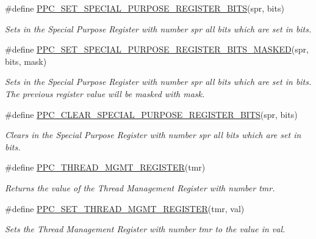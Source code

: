 \begin{DoxyCompactItemize}
\#define \mbox{\hyperlink{group__RTEMSBSPsPowerPCSharedUtility_ga3b8f65ba404c615d00c98d67c03a1240}{P\+P\+C\+\_\+\+S\+E\+T\+\_\+\+S\+P\+E\+C\+I\+A\+L\+\_\+\+P\+U\+R\+P\+O\+S\+E\+\_\+\+R\+E\+G\+I\+S\+T\+E\+R\+\_\+\+B\+I\+TS}}(spr,  bits)
\begin{DoxyCompactList}\small\item\em Sets in the Special Purpose Register with number {\itshape spr} all bits which are set in {\itshape bits}. \end{DoxyCompactList}\item 
\#define \mbox{\hyperlink{group__RTEMSBSPsPowerPCSharedUtility_gaabbe2ec03b9f2d8480196fbb227ce74d}{P\+P\+C\+\_\+\+S\+E\+T\+\_\+\+S\+P\+E\+C\+I\+A\+L\+\_\+\+P\+U\+R\+P\+O\+S\+E\+\_\+\+R\+E\+G\+I\+S\+T\+E\+R\+\_\+\+B\+I\+T\+S\+\_\+\+M\+A\+S\+K\+ED}}(spr,  bits,  mask)
\begin{DoxyCompactList}\small\item\em Sets in the Special Purpose Register with number {\itshape spr} all bits which are set in {\itshape bits}. The previous register value will be masked with {\itshape mask}. \end{DoxyCompactList}\item 
\#define \mbox{\hyperlink{group__RTEMSBSPsPowerPCSharedUtility_ga57428a23dfb8f42b7c7a4ff28cdfae4f}{P\+P\+C\+\_\+\+C\+L\+E\+A\+R\+\_\+\+S\+P\+E\+C\+I\+A\+L\+\_\+\+P\+U\+R\+P\+O\+S\+E\+\_\+\+R\+E\+G\+I\+S\+T\+E\+R\+\_\+\+B\+I\+TS}}(spr,  bits)
\begin{DoxyCompactList}\small\item\em Clears in the Special Purpose Register with number {\itshape spr} all bits which are set in {\itshape bits}. \end{DoxyCompactList}\item 
\#define \mbox{\hyperlink{group__RTEMSBSPsPowerPCSharedUtility_gafcbb61249c0713163c2c490cfa6b5766}{P\+P\+C\+\_\+\+T\+H\+R\+E\+A\+D\+\_\+\+M\+G\+M\+T\+\_\+\+R\+E\+G\+I\+S\+T\+ER}}(tmr)
\begin{DoxyCompactList}\small\item\em Returns the value of the Thread Management Register with number {\itshape tmr}. \end{DoxyCompactList}\item 
\#define \mbox{\hyperlink{group__RTEMSBSPsPowerPCSharedUtility_ga90d0f8d8c6839c36fdf3054d86ed04a8}{P\+P\+C\+\_\+\+S\+E\+T\+\_\+\+T\+H\+R\+E\+A\+D\+\_\+\+M\+G\+M\+T\+\_\+\+R\+E\+G\+I\+S\+T\+ER}}(tmr,  val)
\begin{DoxyCompactList}\small\item\em Sets the Thread Management Register with number {\itshape tmr} to the value in {\itshape val}. \end{DoxyCompactList}\item 

\end{DoxyCompactItemize}
